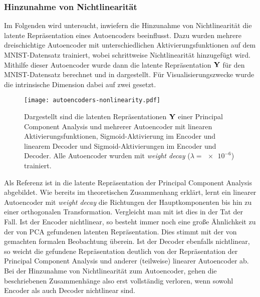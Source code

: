 \subsubsection{Hinzunahme von Nichtlinearität}

Im Folgenden wird untersucht, inwiefern die Hinzunahme von Nichtlinearität die latente
Repräsentation eines Autoencoders beeinflusst. Dazu wurden mehrere dreischichtige Autoencoder mit
unterschiedlichen Aktivierungsfunktionen auf dem MNIST-Datensatz trainiert, wobei schrittweise
Nichtlinearität hinzugefügt wird. Mithilfe dieser Autoencoder wurde dann die latente Repräsentation
$\mathbf{Y}$ für den MNIST-Datensatz berechnet und in 
dargestellt. Für Visualisierungszwecke wurde die intrinsische Dimension dabei auf zwei gesetzt.
\begin{figure}[ht]
	\centering
	\texttt{[image: autoencoders-nonlinearity.pdf]}
	\caption[Latente Repräsentationen von PCA und drei Autoencoder mit unterschiedlichen Aktivierungsfunktionen]{Dargestellt sind die latenten Repräsentationen $\mathbf{Y}$ einer \captiona Principal Component Analysis und mehrerer Autoencoder mit \captionb linearen Aktivierungsfunktionen, \captionc Sigmoid-Aktivierung im Encoder und linearem Decoder und \captiond Sigmoid-Aktivierungen im Encoder und Decoder. Alle Autoencoder wurden mit \textit{weight decay} ($\lambda = \num{e-6}$) trainiert.}
	\label{fig:Autoencoder-Nichtlinearitaet}
\end{figure}
Als Referenz ist in \captiona die latente Repräsentation der Principal Component Analysis abgebildet. Wie bereits im theoretischen Zusammenhang erklärt, lernt ein linearer Autoencoder mit \textit{weight decay} die Richtungen der Hauptkomponenten bis hin zu einer orthogonalen Transformation. Vergleicht man  \captiona mit \captionb ist dies in der Tat der Fall. Ist der Encoder nichtlinear, so besteht immer noch eine große Ähnlichkeit zu der von PCA gefundenen latenten Repräsentation. Dies stimmt mit der von \textcite{Bourlard.1988} gemachten formalen Beobachtung überein. Ist der Decoder ebenfalls nichtlinear, so weicht die gefundene Repräsentation deutlich von der Repräsentation der Principal Component Analysis und anderer (teilweise) linearer Autoencoder ab. Bei der Hinzunahme von Nichtlinearität zum Autoencoder, gehen die beschriebenen Zusammenhänge also erst vollständig verloren, wenn sowohl Encoder als auch Decoder nichtlinear sind.
